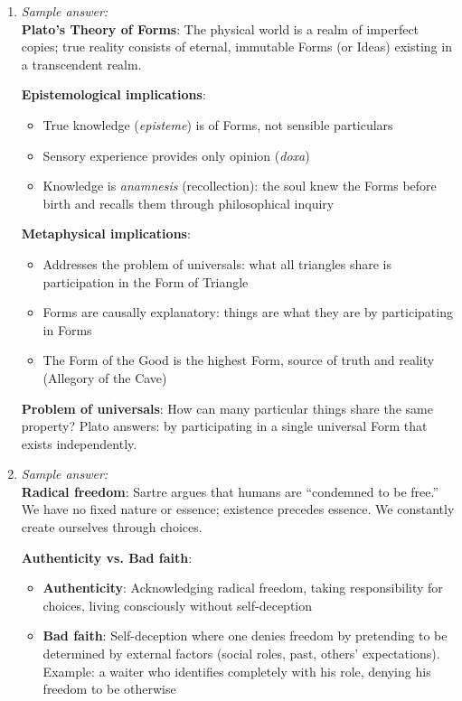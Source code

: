 \documentclass[11pt]{article}
\begin{document}
\begin{enumerate}[label=\textbf{\arabic*.}]
  \item \emph{Sample answer:}\\
  \textbf{Plato's Theory of Forms}: The physical world is a realm of imperfect copies; true reality 
  consists of eternal, immutable Forms (or Ideas) existing in a transcendent realm.

  \textbf{Epistemological implications}:
  \begin{itemize}
    \item True knowledge (\textit{episteme}) is of Forms, not sensible particulars
    \item Sensory experience provides only opinion (\textit{doxa})
    \item Knowledge is \textit{anamnesis} (recollection): the soul knew the Forms before birth and 
    recalls them through philosophical inquiry
  \end{itemize}

  \textbf{Metaphysical implications}:
  \begin{itemize}
    \item Addresses the problem of universals: what all triangles share is participation in the Form 
    of Triangle
    \item Forms are causally explanatory: things are what they are by participating in Forms
    \item The Form of the Good is the highest Form, source of truth and reality (Allegory of the Cave)
  \end{itemize}

  \textbf{Problem of universals}: How can many particular things share the same property? Plato answers: 
  by participating in a single universal Form that exists independently.

  \item \emph{Sample answer:}\\
  \textbf{Radical freedom}: Sartre argues that humans are ``condemned to be free.'' We have no fixed 
  nature or essence; existence precedes essence. We constantly create ourselves through choices.

  \textbf{Authenticity vs. Bad faith}:
  \begin{itemize}
    \item \textbf{Authenticity}: Acknowledging radical freedom, taking responsibility for choices, 
    living consciously without self-deception
    \item \textbf{Bad faith}: Self-deception where one denies freedom by pretending to be determined 
    by external factors (social roles, past, others' expectations). Example: a waiter who identifies 
    completely with his role, denying his freedom to be otherwise
  \end{itemize}


\end{enumerate}
\end{document}
